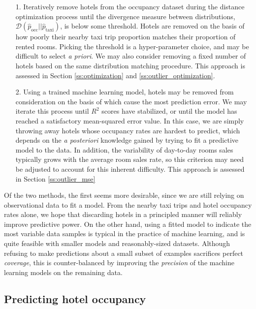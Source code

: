 \documentclass[useAMS, referee, usenatbib]{biom}
\begin{document}
\begin{itemize}

\item [1.] Iteratively remove hotels from the occupancy dataset during the distance optimization process until the divergence measure between distributions, $\mathcal{D} (\hat{p}_{\mathrm{occ}} || \hat{p}_{\mathrm{taxi}})$, is below some threshold. Hotels are removed on the basis of how poorly their nearby taxi trip proportion matches their proportion of rented rooms. Picking the threshold is a hyper-parameter choice, and may be difficult to select \textit{a priori}. We may also consider removing a fixed number of hotels based on the same distribution matching procedure. This approach is assessed in Section \ref{ss:optimization} and \ref{ss:outlier_optimization}.

\item [2.] Using a trained machine learning model, hotels may be removed from consideration on the basis of which cause the most prediction error. We may iterate this process until $R^2$ scores have stabilized, or until the model has reached a satisfactory mean-squared error value. In this case, we are simply throwing away hotels whose occupancy rates are hardest to predict, which depends on the \textit{a posteriori} knowledge gained by trying to fit a predictive model to the data. In addition, the variability of day-to-day rooms sales typically grows with the average room sales rate, so this criterion may need be adjusted to account for this inherent difficulty. This approach is assessed in Section \ref{ss:outlier_mse}

\end{itemize}

Of the two methods, the first seems more desirable, since we are still relying on observational data to fit a model. From the nearby taxi trips and hotel occupancy rates alone, we hope that discarding hotels in a principled manner will reliably improve predictive power. On the other hand, using a fitted model to indicate the most variable data samples is typical in the practice of machine learning, and is quite feasible with smaller models and reasonably-sized datasets. Although refusing to make predictions about a small subset of examples sacrifices perfect \textit{coverage}, this is counter-balanced by improving the \textit{precision} of the machine learning models on the remaining data.

\subsection{Predicting hotel occupancy}
\end{document}
